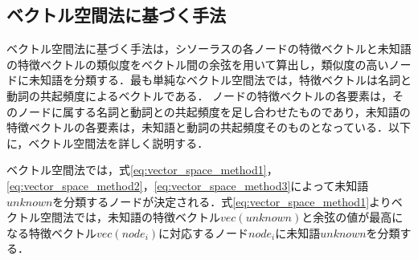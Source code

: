 \documentclass[japanese]{jnlp_1.4}
\begin{document}
\subsection{ベクトル空間法に基づく手法}\label{vector_space_method}

ベクトル空間法に基づく手法は，シソーラスの各ノードの特徴ベクトルと未知語の特徴ベクトルの類似度をベクトル間の余弦を用いて算出し，類似度の高いノードに未知語を分類する．最も単純なベクトル空間法では，特徴ベクトルは名詞と動詞の共起頻度によるベクトルである．
ノードの特徴ベクトルの各要素は，そのノードに属する名詞と動詞との共起頻度を足し合わせたものであり，未知語の特徴ベクトルの各要素は，未知語と動詞の共起頻度そのものとなっている．以下に，ベクトル空間法を詳しく説明する．

ベクトル空間法では，式\ref{eq:vector_space_method1}，\ref{eq:vector_space_method2}，\ref{eq:vector_space_method3}によって未知語$\mathit{unknown}$を分類するノードが決定される．式\ref{eq:vector_space_method1}よりベクトル空間法では，未知語の特徴ベクトル$\mathit{vec}(\mathit{unknown})$と余弦の値が最高になる特徴ベクトル$\mathit{vec}(\mathit{node}_i)$に対応するノード$\mathit{node}_i$に未知語$\mathit{unknown}$を分類する．
\end{document}
